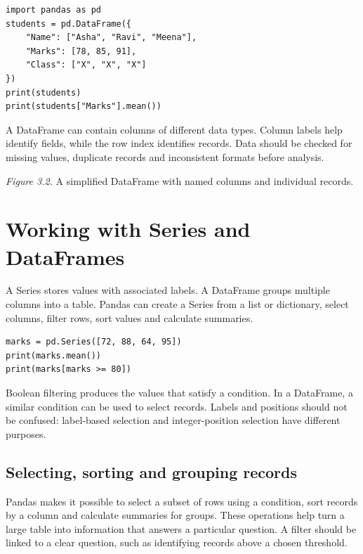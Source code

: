 \documentclass[11pt,openany,oneside]{book}
\begin{document}
\begin{lstlisting}[style=pythonstyle]
import pandas as pd
students = pd.DataFrame({
    "Name": ["Asha", "Ravi", "Meena"],
    "Marks": [78, 85, 91],
    "Class": ["X", "X", "X"]
})
print(students)
print(students["Marks"].mean())
\end{lstlisting}
A DataFrame can contain columns of different data types. Column labels help identify fields, while the row index identifies records. Data should be checked for missing values, duplicate records and inconsistent formats before analysis.

\begin{center}
\end{center}
\textit{Figure 3.2.} A simplified DataFrame with named columns and individual records.

\section{Working with Series and DataFrames}
A Series stores values with associated labels. A DataFrame groups multiple columns into a table. Pandas can create a Series from a list or dictionary, select columns, filter rows, sort values and calculate summaries.

\begin{lstlisting}[style=pythonstyle]
marks = pd.Series([72, 88, 64, 95])
print(marks.mean())
print(marks[marks >= 80])
\end{lstlisting}
Boolean filtering produces the values that satisfy a condition. In a DataFrame, a similar condition can be used to select records. Labels and positions should not be confused: label-based selection and integer-position selection have different purposes.

\subsection{Selecting, sorting and grouping records}
Pandas makes it possible to select a subset of rows using a condition, sort records by a column and calculate summaries for groups. These operations help turn a large table into information that answers a particular question. A filter should be linked to a clear question, such as identifying records above a chosen threshold.
\end{document}
